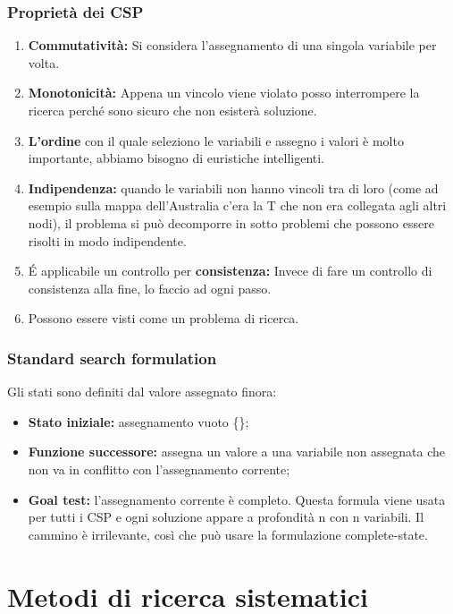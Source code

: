 \subsection{Proprietà dei CSP}
\begin{enumerate}
    \item \textbf{Commutatività:} Si considera l'assegnamento di una singola
          variabile per volta.
    \item \textbf{Monotonicità:} Appena un vincolo viene violato posso
          interrompere la ricerca perché sono sicuro che non esisterà soluzione.
    \item \textbf{L'ordine} con il quale seleziono le variabili e assegno i
          valori è molto importante, abbiamo bisogno di euristiche intelligenti.
    \item \textbf{Indipendenza:} quando le variabili non hanno vincoli tra di
          loro (come ad esempio sulla mappa dell'Australia c'era la T che non era
          collegata agli altri nodi), il problema si può decomporre in sotto problemi
          che possono essere risolti in modo indipendente.
    \item É applicabile un controllo per \textbf{consistenza:} Invece di fare un
          controllo di consistenza alla fine, lo faccio ad ogni passo.
    \item Possono essere visti come un problema di ricerca.
\end{enumerate}

\subsection{Standard search formulation}
Gli stati sono definiti dal valore assegnato finora:
\begin{itemize}
    \item \textbf{Stato iniziale: }assegnamento vuoto \{\};
    \item \textbf{Funzione successore: }assegna un valore a una variabile non
          assegnata che non va in conflitto con l'assegnamento corrente;
    \item \textbf{Goal test: }l'assegnamento corrente è completo. Questa formula
          viene usata per tutti i CSP e ogni soluzione appare a profondità n con n
          variabili. Il cammino è irrilevante, così che può usare la formulazione
          complete-state.
\end{itemize}


\chapter{Metodi di ricerca sistematici} \label{ch:Metodi di ricerca sistematici}
